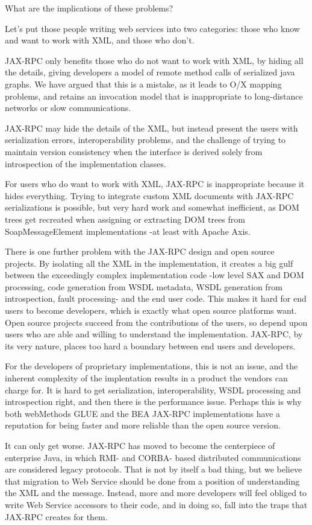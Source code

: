 \documentclass[draft]{article}
\begin{document}
What are the implications of these problems?

Let's put those people writing web services into two categories: those
who know and want to work with XML, and those who don't. 

JAX-RPC only benefits those who do not want to work with XML, by hiding
all the details, giving developers a model of remote method calls of
serialized java graphs. We have argued that this is a mistake, 
as it leads to O/X mapping problems, and retains an invocation model
that is inappropriate to long-distance networks or slow communications. 

JAX-RPC may hide the details of the XML, but instead present the users
with serialization errors, interoperability problems, and the challenge
of trying to maintain version consistency when the interface is derived
solely from introspection of the implementation classes.


For users who do want to work with XML, JAX-RPC is inappropriate because
it hides everything. Trying to integrate custom XML documents with
JAX-RPC serializations is possible, but very hard work and somewhat
inefficient, as DOM trees get recreated when assigning or extracting DOM
trees from SoapMessageElement implementations -at least with Apache
Axis.

There is one further problem with the JAX-RPC design and open source
projects. By isolating all the XML in the implementation, it creates a
big gulf between the exceedingly complex implementation code -low level
SAX and DOM processing, code generation from WSDL metadata, WSDL
generation from introspection, fault processing- and the end user code.
This makes it hard for end users to become developers, which is exactly
what open source platforms want. Open source projects succeed from the
contributions of the users, so depend upon users who are able and
willing to understand the implementation. JAX-RPC, by its very nature,
places too hard a boundary between end users and developers.

For the developers of proprietary implementations, this is not an issue,
and the inherent complexity of the implentation results in a product the
vendors can charge for. It is hard to get serialization,
interoperability, WSDL processing and introspection right, and then
there is the performance issue. Perhaps this is why both webMethods GLUE
and the BEA JAX-RPC implementations have a reputation for being faster
and more reliable than the open source version. 

It can only get worse. JAX-RPC has moved to become the centerpiece of
enterprise Java, in which RMI- and CORBA- based distributed
communications are considered legacy protocols. That is not by itself a
bad thing, but we believe that migration to Web Service should be done
from a position of understanding the XML and the message. Instead, more
and more developers will feel obliged to write Web Service accessors to
their code, and in doing so, fall into the traps that JAX-RPC creates
for them.
\end{document}

